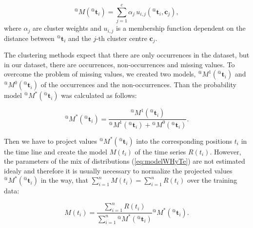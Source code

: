 \begin{equation}\label{eq:modelWHyTe}
{}^{@}M({}^{@}\mathbf{t}_{i}) =  \sum_{j=1}^{c}{\alpha_j\,u_{i,j}\left({}^{@}\mathbf{t}_{i}, \mathbf{c}_{j}\right)},
\end{equation}
%
\noindent where $\alpha_{j}$ are cluster weights and $u_{i,j}$ is a membership function dependent on the distance between ${}^{@}\mathbf{t}_{i}$ and the $j$-th cluster centre $\mathbf{c}_{j}$.

The clustering methods expect that there are only occurrences in the dataset, but in our dataset, there are occurrences, non-occurrences and missing values.
To overcome the problem of missing values, we created two models, ${}^{@}M^{1}({}^{@}\mathbf{t}_{i})$ and ${}^{@}M^{0}({}^{@}\mathbf{t}_{i})$ of the occurrences and the non-occurrences.
Than the probability model ${}^{@}M^{*}({}^{@}\mathbf{t}_{i})$ was calculated as follows:

\begin{equation}\label{eq:probabilityWHyTe}
{}^{@}M^{*}({}^{@}\mathbf{t}_{i}) = \frac{{}^{@}M^{1}({}^{@}\mathbf{t}_{i})}{{}^{@}M^{1}({}^{@}\mathbf{t}_{i}) + {}^{@}M^{0}({}^{@}\mathbf{t}_{i})}.
\end{equation}

Then we have to project values ${}^{@}M^{*}({}^{@}\mathbf{t}_{i})$ into the corresponding positions $t_{i}$ in the time line and create the model $M(t_{i})$ of the time series $R(t_{i})$.
However, the parameters of the mix of distributions (\ref{eq:modelWHyTe}) are not estimated idealy and therefore 
it is usually necessary to normalize the projected values ${}^{@}M^{*}({}^{@}\mathbf{t}_{i})$ in the way, that $\sum^{n}_{i=1}{M(t_{i})} = \sum^{n}_{i=1}{R(t_{i})}$ over the training data:

\begin{equation}\label{eq:modelNormalisation}
M(t_{i}) = \frac{\sum^{n}_{i=1}{R(t_{i})}}{ \sum^{n}_{i=1}{{}^{@}M^{*}({}^{@}\mathbf{t}_{i})}}{}^{@}M^{*}({}^{@}\mathbf{t}_{i}).
\end{equation}






